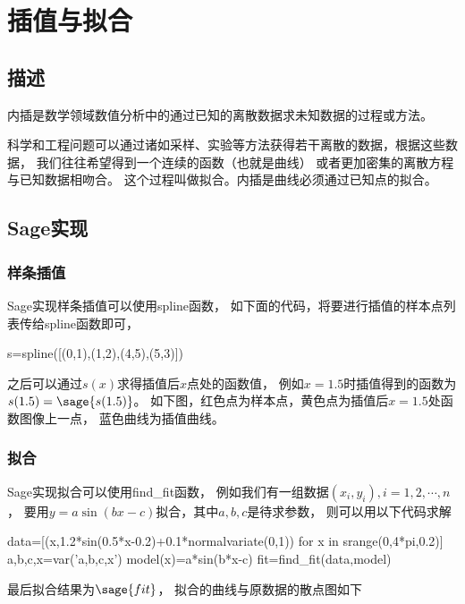 \section{插值与拟合}
\subsection{描述}
内插是数学领域数值分析中的通过已知的离散数据求未知数据的过程或方法。

科学和工程问题可以通过诸如采样、实验等方法获得若干离散的数据，根据这些数据，
我们往往希望得到一个连续的函数（也就是曲线）
或者更加密集的离散方程与已知数据相吻合。
这个过程叫做拟合。内插是曲线必须通过已知点的拟合。

\subsection{Sage实现}
\subsubsection{样条插值}
Sage实现样条插值可以使用spline函数，
如下面的代码，将要进行插值的样本点列表传给spline函数即可，
\begin{sageblock}
s=spline([(0,1),(1,2),(4,5),(5,3)])
\end{sageblock}
之后可以通过$s(x)$求得插值后$x$点处的函数值，
例如$x=1.5$时插值得到的函数为$s(1.5)=\sage{s(1.5)}$。
如下图，红色点为样本点，黄色点为插值后$x=1.5$处函数图像上一点，
蓝色曲线为插值曲线。


\subsubsection{拟合}
Sage实现拟合可以使用find\_fit函数，
例如我们有一组数据$(x_i,y_i),i=1,2,\cdots,n$，
要用$y=a\sin(bx-c)$拟合，其中$a,b,c$是待求参数，
则可以用以下代码求解
\begin{sageblock}
data=[(x,1.2*sin(0.5*x-0.2)+0.1*normalvariate(0,1)) for x in srange(0,4*pi,0.2)]
a,b,c,x=var('a,b,c,x')
model(x)=a*sin(b*x-c)
fit=find_fit(data,model)
\end{sageblock}

最后拟合结果为$\sage{fit}$，
拟合的曲线与原数据的散点图如下



